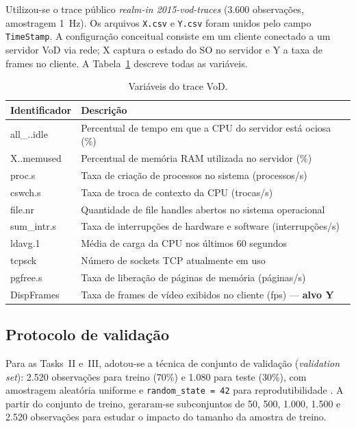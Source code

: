 \documentclass[12pt,a4paper]{article}
\begin{document}
Utilizou-se o trace público \textit{realm-in 2015-vod-traces} \cite{yanggratoken2015}
(3.600 observações, amostragem 1~Hz). Os arquivos \texttt{X.csv} e \texttt{Y.csv}
foram unidos pelo campo \texttt{TimeStamp}. A configuração conceitual consiste em um
cliente conectado a um servidor VoD via rede; X captura o estado do SO no servidor e
Y a taxa de frames no cliente. A Tabela~\ref{tab:variaveis} descreve todas as variáveis.

\begin{table}[H]
\centering
\caption{Variáveis do trace VoD.}
\label{tab:variaveis}
\renewcommand{\arraystretch}{1.15}
\begin{tabular}{>{\ttfamily}lp{10cm}}
\toprule
\normalfont\textbf{Identificador} & \textbf{Descrição} \\
\midrule
all\_..idle  & Percentual de tempo em que a CPU do servidor está ociosa (\%) \\
X..memused   & Percentual de memória RAM utilizada no servidor (\%) \\
proc.s       & Taxa de criação de processos no sistema (processos/s) \\
cswch.s      & Taxa de troca de contexto da CPU (trocas/s) \\
file.nr      & Quantidade de file handles abertos no sistema operacional \\
sum\_intr.s  & Taxa de interrupções de hardware e software (interrupções/s) \\
ldavg.1      & Média de carga da CPU nos últimos 60 segundos \\
tcpsck       & Número de sockets TCP atualmente em uso \\
pgfree.s     & Taxa de liberação de páginas de memória (páginas/s) \\
DispFrames   & Taxa de frames de vídeo exibidos no cliente (fps) --- \textbf{alvo Y} \\
\bottomrule
\end{tabular}
\end{table}

\subsection{Protocolo de validação}

Para as Tasks~II e~III, adotou-se a técnica de conjunto de validação
(\textit{validation set}): 2.520 observações para treino (70\%) e 1.080 para teste
(30\%), com amostragem aleatória uniforme e \texttt{random\_state\,=\,42} para
reprodutibilidade \cite{pasquini2026}. A partir do conjunto de treino, geraram-se
subconjuntos de 50, 500, 1.000, 1.500 e 2.520 observações para estudar o impacto do
tamanho da amostra de treino.
\end{document}
